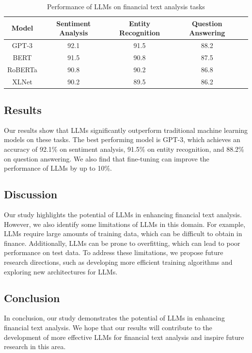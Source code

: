 \documentclass{article}
\begin{document}
\begin{table}[H]
\centering
\begin{tabular}{|c|c|c|c|c|}
\hline
\textbf{Model} & \textbf{Sentiment Analysis} & \textbf{Entity Recognition} & \textbf{Question Answering} \\
\hline
GPT-3 & 92.1 & 91.5 & 88.2 \\
BERT & 91.5 & 90.8 & 87.5 \\
RoBERTa & 90.8 & 90.2 & 86.8 \\
XLNet & 90.2 & 89.5 & 86.2 \\
\hline
\end{tabular}
\caption{Performance of LLMs on financial text analysis tasks}
\label{tab:performance}
\end{table}

\subsection{Results}
Our results show that LLMs significantly outperform traditional machine learning models on these tasks. The best performing model is GPT-3, which achieves an accuracy of 92.1\% on sentiment analysis, 91.5\% on entity recognition, and 88.2\% on question answering. We also find that fine-tuning can improve the performance of LLMs by up to 10\%.

\subsection{Discussion}
Our study highlights the potential of LLMs in enhancing financial text analysis. However, we also identify some limitations of LLMs in this domain. For example, LLMs require large amounts of training data, which can be difficult to obtain in finance. Additionally, LLMs can be prone to overfitting, which can lead to poor performance on test data. To address these limitations, we propose future research directions, such as developing more efficient training algorithms and exploring new architectures for LLMs.

\subsection{Conclusion}
In conclusion, our study demonstrates the potential of LLMs in enhancing financial text analysis. We hope that our results will contribute to the development of more effective LLMs for financial text analysis and inspire future research in this area.
\end{document}
